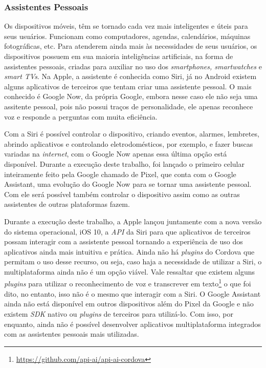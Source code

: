 \subsubsection{Assistentes Pessoais} \label{subsubsec:siri}
Os dispositivos móveis, têm se tornado cada vez mais inteligentes e úteis para seus usuários. Funcionam como computadores, agendas, calendários, máquinas fotográficas, etc. Para atenderem ainda mais às necessidades de 
seus usuários, os dispositivos possuem em sua maioria inteligências artificiais, na forma de assistentes pessoais, criadas para auxiliar no uso dos \textit{smartphones, smartwatches} e \textit{smart TVs}. 
Na Apple, a assistente é conhecida como Siri, já no Android existem alguns aplicativos de terceiros que tentam criar uma assistente pessoal. O mais conhecido é Google Now, da própria Google, 
embora nesse caso ele não seja uma assitente pessoal, pois não possui traços de personalidade, ele apenas reconhece voz e responde a perguntas com muita eficiência.

Com a Siri é possível controlar o dispositivo, criando eventos, alarmes, lembretes, abrindo aplicativos e controlando eletrodomésticos, por exemplo, e fazer buscas variadas na \textit{internet}, com o Google Now 
apenas essa última opção está disponível. Durante a execução deste trabalho, foi lançado o primeiro celular inteiramente feito pela Google chamado de Pixel, que conta com o Google Assistant, uma evolução do Google Now 
para se tornar uma assistente pessoal. Com ele será possível também controlar o dispositivo assim como as outras assistentes de outras plataformas fazem. 

Durante a execução deste trabalho, a Apple lançou juntamente com a nova versão do sistema operacional, iOS 10, a \textit{API} da Siri para que aplicativos de terceiros possam interagir com a assistente pessoal tornando 
a experiência de uso dos aplicativos ainda mais intuitiva e prática. Ainda não há \textit{plugins} do Cordova que permitam o uso desse recurso, ou seja, caso haja a necessidade de utilizar a Siri, o multiplataforma ainda 
não é um opção viável. Vale ressaltar que existem alguns \textit{plugins} para utilizar o reconhecimento de voz e transcrever em texto\footnote{\url{https://github.com/api-ai/api-ai-cordova}} o que foi dito, no entanto, 
isso não é o mesmo que interagir com a Siri. O Google Assistant ainda não está disponível em outros dispositivos além do Pixel da Google e não existem \textit{SDK} nativo ou \textit{plugins} de terceiros para utilizá-lo. 
Com isso, por enquanto, ainda não é possível desenvolver aplicativos multiplataforma integrados com as assistentes pessoais mais utilizadas.

